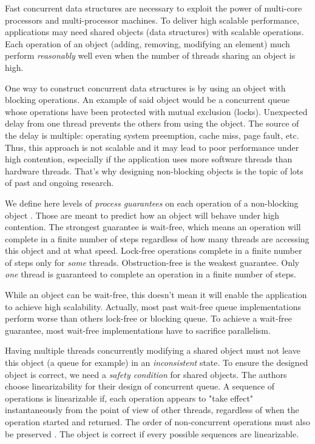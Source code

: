 Fast concurrent data structures are necessary to exploit the power of multi-core
processors and multi-processor machines. To deliver high scalable performance,
applications may need shared objects (data structures) with scalable operations.
Each operation of an object (adding, removing, modifying an element) much
perform \textit{reasonably} well even when the number of threads sharing an
object is high.

One way to construct concurrent data structures is by using an object with
blocking operations. An example of said object would be a concurrent queue whose
operations have been protected with mutual exclusion (locks). Unexpected delay
from one thread prevents the others from using the object. The source of the
delay is multiple: operating system preemption, cache miss, page fault, etc.
Thus, this approach is not scalable and it may lead to poor performance under
high contention, especially if the application uses more software threads than
hardware threads. That's why designing non-blocking objects is the topic of lots
of past and ongoing research. \medskip

 We define here levels of \textit{process guarantees} on
each operation of a non-blocking object \cite{Yang:2016:WQF:3016078.2851168}.
Those are meant to predict how an object will behave under high contention. The
strongest guarantee is wait-free, which means an operation will complete in a
finite number of steps regardless of how many threads are accessing this object
and at what speed. Lock-free operations complete in a finite number of steps
only for \textit{some} threads. Obstruction-free is the weakest guarantee. Only
\textit{one} thread is guaranteed to complete an operation in a finite number of
steps.

While an object can be wait-free, this doesn't mean it will enable the
application to achieve high scalability. Actually, most past wait-free queue
implementations perform worse than others lock-free or blocking queue. To
achieve a wait-free guarantee, most wait-free implementations have to sacrifice
parallelism. \medskip

 Having multiple threads concurrently modifying a shared
object must not leave this object (a queue for example) in an
\textit{inconsistent} state. To ensure the designed object is correct, we need a
\textit{safety condition} for shared objects. The authors choose linearizability
for their design of concurrent queue. A sequence of operations is linearizable
if, each operation appears to "take effect" instantaneously from the point of
view of other threads, regardless of when the operation started and returned.
The order of non-concurrent operations must also be preserved
\cite{Herlihy:1990:LCC:78969.78972}. The object is correct if every possible
sequences are linearizable.

